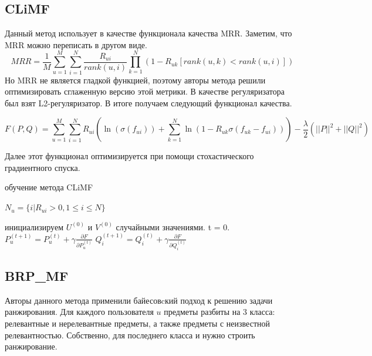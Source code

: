 \documentclass[14pt]{extarticle}
\begin{document}
\subsection{CLiMF}
Данный метод использует в качестве функционала качества MRR. Заметим, что MRR можно переписать в другом виде.
\begin{equation*}
 MRR =\frac{1}{M}\sum_{u=1}^M \sum_{i=1}^N \frac{R_{ui}}{rank(u,i)}\prod_{k=1}^N(1 - R_{uk}[rank(u,k) < rank(u, i)])
\end{equation*}
 Но  MRR не является гладкой функцией, поэтому авторы метода решили оптимизировать сглаженную версию этой метрики. В качестве регуляризатора был взят L2-регуляризатор. В итоге получаем следующий функционал качества.

\begin{equation*}
	F(P, Q) = \sum_{u=1}^M \sum_{i=1}^N R_{ui}(\ln(\sigma(f_{ui})) + \sum_{k=1}^N \ln(1 - R_{uk}\sigma(f_{uk} - f_{ui}))) - \frac{\lambda}{2}({||P||}^2 + {||Q||}^2 ) 
	\end{equation*}	

Далее этот функционал оптимизируется при помощи стохастического градиентного спуска.

\begin{algorithm}[h]
\caption{обучение метода CLiMF}
\begin{algorithmic}[1]
\State $N_u = \{i | R_{ui} > 0, 1 \leq i \leq N\}$
\EndFor

инициализируем $U^{(0)}$ и $V^{(0)}$ случайными значениями. t = 0.
\Repeat {} 
		\State $P_u^{(t+1)} = P_u^{(t)} + \gamma \frac{\partial F}{\partial P_u^{(t)}}$
				\State 	$Q_i^{(t+1)} = Q_i^{(t)} + \gamma \frac{\partial F}{\partial 	  																						Q_i^{(t)}}$		
			\EndFor	
	\EndFor 
{}

\end{algorithmic}
\label{alg:climf}
\end{algorithm}
\newpage
\subsection{BRP\_MF}  	

Авторы данного метода применили байесовcкий подход к решению задачи ранжирования. Для каждого пользователя $u$  предметы  разбиты на 3 класса: релевантные и нерелевантные предметы, а также предметы с неизвестной релевантностью. Собственно, для последнего класса и нужно  строить ранжирование. 
\end{document}
